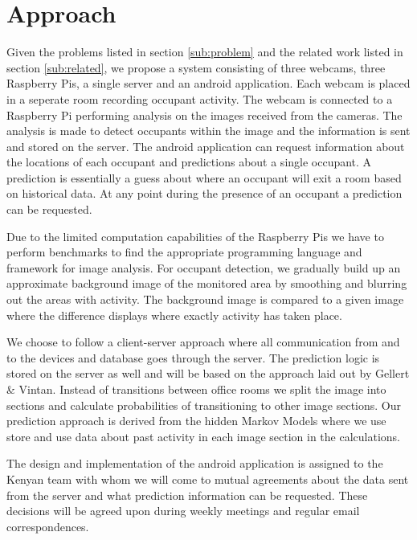 \section{Approach}

Given the problems listed in section \ref{sub:problem} and the related work listed in section \ref{sub:related}, we propose a system consisting of three webcams, three Raspberry Pis, a single server and an android application. Each webcam is placed in a seperate room recording occupant activity. The webcam is connected to a Raspberry Pi performing analysis on the images received from the cameras. The analysis is made to detect occupants within the image and the information is sent and stored on the server. The android application can request information about the locations of each occupant and predictions about a single occupant. A prediction is essentially a guess about where an occupant will exit a room based on historical data. At any point during the presence of an occupant a prediction can be requested. 

Due to the limited computation capabilities of the Raspberry Pis we have to perform benchmarks to find the appropriate programming language and framework for image analysis. For occupant detection, we gradually build up an approximate background image of the monitored area by smoothing and blurring out the areas with activity. The background image is compared to a given image where the difference displays where exactly activity has taken place. 

We choose to follow a client-server approach where all communication from and to the devices and database goes through the server. The prediction logic is stored on the server as well and will be based on the approach laid out by Gellert \& Vintan\cite{gellert}. Instead of transitions between office rooms we split the image into sections and calculate probabilities of transitioning to other image sections. Our prediction approach is derived from the hidden Markov Models where we use store and use data about past activity in each image section in the calculations. 

The design and implementation of the android application is assigned to the Kenyan team with whom we will come to mutual agreements about the data sent from the server and what prediction information can be requested. These decisions will be agreed upon during weekly meetings and regular email correspondences.

